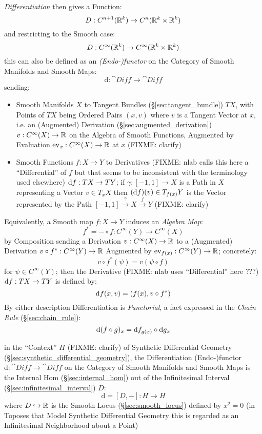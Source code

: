 \emph{Differentiation} then gives a Function:
\[
  D : C^{n+1}(\mathbb{R}^k) \rightarrow C^n(\mathbb{R}^k \times \mathbb{R}^k)
\]
and restricting to the Smooth case:
\[
  D : C^\infty(\mathbb{R}^k) \rightarrow C^\infty(\mathbb{R}^k \times \mathbb{R}^k)
\]
this can also be defined as an \emph{(Endo-)functor} on the Category of Smooth
Manifolds and Smooth Maps:
\[
  \mathrm{d} : \cat{Diff} \rightarrow \cat{Diff}
\]
sending:
\begin{itemize}
  \item Smooth Manifolds $X$ to Tangent Bundles (\S\ref{sec:tangent_bundle}) $T
    X$, with Points of $T X$ being Ordered Pairs $(x, v)$ where $v$ is a Tangent
    Vector at $x$, i.e. an (Augmented) Derivation
    (\S\ref{sec:augmented_derivation}) $v : C^\infty(X) \rightarrow \mathbb{R}$ on
    the Algebra of Smooth Functions, Augmented by Evaluation $\mathrm{ev}_x :
    C^\infty(X) \rightarrow \mathbb{R}$ at $x$ (FIXME: clarify)
  \item Smooth Functions $f : X \rightarrow Y$ to Derivatives (FIXME: nlab calls
    this here a ``Differential'' of $f$ but that seems to be inconsistent with
    the terminology used elsewhere) $\mathrm{d}f : TX \rightarrow TY$; if $\gamma
    : [-1,1] \rightarrow X$ is a Path in $X$ representing a Vector
    $v \in T_x{X}$ then $(\mathrm{d}f)(v) \in T_{f(x)}Y$ is the Vector represented
    by the Path $[-1, 1] \xrightarrow{\gamma} X \xrightarrow{f} Y$
    (FIXME: clarify)
\end{itemize}
Equivalently, a Smooth map $f : X \rightarrow Y$ induces an \emph{Algebra Map}:
\[
  f^* = - \circ f : C^\infty(Y) \rightarrow C^\infty(X)
\]
by Composition sending a Derivation $v : C^\infty(X) \rightarrow \mathbb{R}$ to a
(Augmented) Derivation $v \circ f^* : C^\infty(Y) \rightarrow \mathbb{R}$ Augmented
by $\mathrm{ev}_{f(x)} : C^\infty(Y) \rightarrow \mathbb{R}$; concretely:
\[
  v \circ f^*(\psi) = v(\psi \circ f)
\]
for $\psi \in C^\infty(Y)$; then the Derivative (FIXME: nlab uses
``Differential'' here ???) $\mathrm{d}f : T X \rightarrow T Y$ is defined by:
\[
  \mathrm{d}f(x,v) = (f(x), v \circ f^*)
\]
By either description Differentiation is \emph{Functorial}, a fact expressed in
the \emph{Chain Rule} (\S\ref{sec:chain_rule}):
\[
  \mathrm{d}(f \circ g)_x = \mathrm{d}f_{g(x)} \circ \mathrm{d}g_x
\]

in the ``Context'' $H$ (FIXME: clarify) of Synthetic Differential Geometry
(\S\ref{sec:synthetic_differential_geometry}), the Differentiation
(Endo-)functor $\mathrm{d} : \cat{Diff} \rightarrow \cat{Diff}$ on the Category
of Smooth Manifolds and Smooth Maps is the Internal Hom
(\S\ref{sec:internal_hom}) out of the Infinitesimal Interval
(\S\ref{sec:infinitesimal_interval}) $D$:
\[
  \mathrm{d} = [D,-] : H \rightarrow H
\]
where $D \hookrightarrow \mathbb{R}$ is the Smooth Locus (\S\ref{sec:smooth_locus})
defined by $x^2 = 0$ (in Toposes that Model Synthetic Differential Geometry this
is regarded as an Infinitesimal Neighborhood about a Point)

